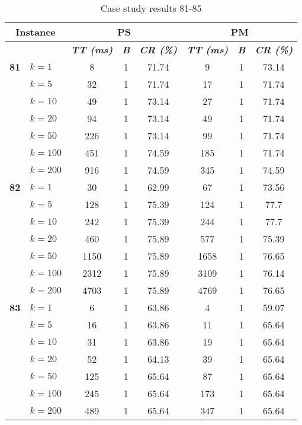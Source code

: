     \begin{table}[htbp]
    \caption{Case study results 81-85}
    \centering
    \begin{tabular}{|l|l|c|c|c|c|c|c|}
    \hline
    \multicolumn{ 2}{|c|}{\textbf{Instance}} & \multicolumn{ 3}{c|}{\textbf{PS}} & \multicolumn{ 3}{c|}{\textbf{PM}} \\ \hline
    \multicolumn{ 2}{|l|}{} & \textbf{\textit{TT (ms)}} & \textbf{\textit{B}} & \textbf{\textit{CR (\%)}} & \textbf{\textit{TT (ms)}} & \textbf{\textit{B}} & \textbf{\textit{CR (\%)}} \\ \hline
    \multicolumn{1}{|r|}{\textbf{81}} & $k=1$ & 8 & 1 & 71.74 & 9 & 1 & 73.14 \\ 
     & $k=5$ & 32 & 1 & 71.74 & 17 & 1 & 71.74 \\ 
     & $k=10$ & 49 & 1 & 73.14 & 27 & 1 & 71.74 \\ 
     & $k=20$ & 94 & 1 & 73.14 & 49 & 1 & 71.74 \\ 
     & $k=50$ & 226 & 1 & 73.14 & 99 & 1 & 71.74 \\ 
     & $k=100$ & 451 & 1 & 74.59 & 185 & 1 & 71.74 \\ 
     & $k=200$ & 916 & 1 & 74.59 & 345 & 1 & 74.59 \\ \hline
    \multicolumn{1}{|r|}{\textbf{82}} & $k=1$ & 30 & 1 & 62.99 & 67 & 1 & 73.56 \\ 
     & $k=5$ & 128 & 1 & 75.39 & 124 & 1 & 77.7 \\ 
     & $k=10$ & 242 & 1 & 75.39 & 244 & 1 & 77.7 \\ 
     & $k=20$ & 460 & 1 & 75.89 & 577 & 1 & 75.39 \\ 
     & $k=50$ & 1150 & 1 & 75.89 & 1658 & 1 & 76.65 \\ 
     & $k=100$ & 2312 & 1 & 75.89 & 3109 & 1 & 76.14 \\ 
     & $k=200$ & 4703 & 1 & 75.89 & 4769 & 1 & 76.65 \\ \hline
    \multicolumn{1}{|r|}{\textbf{83}} & $k=1$ & 6 & 1 & 63.86 & 4 & 1 & 59.07 \\ 
     & $k=5$ & 16 & 1 & 63.86 & 11 & 1 & 65.64 \\ 
     & $k=10$ & 31 & 1 & 63.86 & 19 & 1 & 65.64 \\ 
     & $k=20$ & 52 & 1 & 64.13 & 39 & 1 & 65.64 \\ 
     & $k=50$ & 125 & 1 & 65.64 & 87 & 1 & 65.64 \\ 
     & $k=100$ & 245 & 1 & 65.64 & 173 & 1 & 65.64 \\ 
     & $k=200$ & 489 & 1 & 65.64 & 347 & 1 & 65.64 \\ \hline

\end{tabular}
\end{table}
